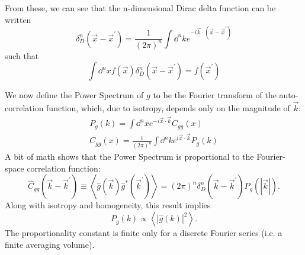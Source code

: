 From these, we can see that the n-dimensional Dirac delta 
function can be written
\begin{equation}
  \label{ddelta_form}
  \delta^n_D(\vec x-\vec x^\prime) = \frac{1}{(2\pi)^n}\int \dd^nke^{-i\vec k\cdot(\vec x-\vec x^\prime)}
\end{equation}
such that 
\begin{equation}
  \label{ddelta_def}
  \int \dd^nx f(\vec x)\delta^n_D(\vec x-\vec x^\prime) = f(\vec x^\prime)
\end{equation}

We now define the Power Spectrum of $g$ to be the Fourier transform of the 
auto-correlation function, which, due to isotropy, depends only on the 
magnitude of $\vec k$:
\begin{eqnarray}
  \label{pspec}
  P_g(k) = \int \dd^nx e^{-i\vec x\cdot\vec k}C_{gg}(x)\nonumber\\
  C_{gg}(x) = \frac{1}{(2\pi)^n}\int\dd^nke^{i\vec x\cdot\vec k}P_g(k)
\end{eqnarray}
A bit of math shows that the Power Spectrum is proportional to the 
Fourier-space correlation function:
\begin{equation}
  \label{pspec_corr}
  \hat C_{gg}(\vec k-\vec k^\prime) 
  \equiv \left\langle\hat g(\vec k)\hat g^*(\vec k^\prime) \right\rangle 
  =  (2\pi)^n \delta^n_D(\vec k -\vec k^\prime) P_g(|\vec k|).
\end{equation}
Along with isotropy and homogeneity, this result implies
\begin{equation}
  P_g(k) \propto \left\langle | \hat g(k)|^2 \right\rangle.
\end{equation}
The proportionality constant is finite only for a discrete Fourier series 
(i.e. a finite averaging volume).

